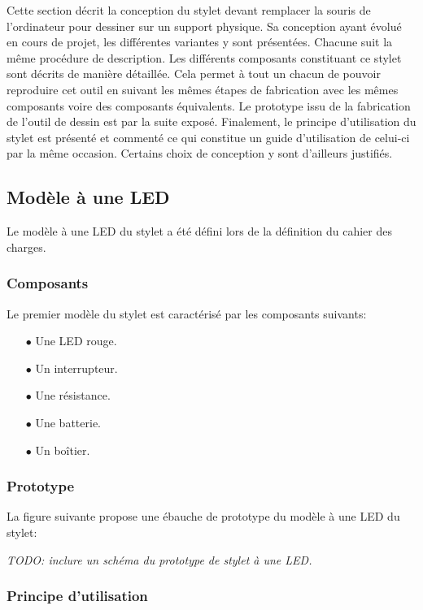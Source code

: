 \documentclass[11pt,a4paper,oldfontcommands]{memoir}
\begin{document}
Cette section décrit la conception du stylet devant remplacer la souris de l'ordinateur pour dessiner sur un support physique. Sa conception ayant évolué en cours de projet, les différentes variantes y sont présentées. Chacune suit la même procédure de description. Les différents composants constituant ce stylet sont décrits de manière détaillée. Cela permet à tout un chacun de pouvoir reproduire cet outil en suivant les mêmes étapes de fabrication avec les mêmes composants voire des composants équivalents. Le prototype issu de la fabrication de l'outil de dessin est par la suite exposé. Finalement, le principe d'utilisation du stylet est présenté et commenté ce qui constitue un guide d'utilisation de celui-ci par la même occasion. Certains choix de conception y sont d'ailleurs justifiés.

\subsection{Modèle à une LED}

Le modèle à une LED du stylet a été défini lors de la définition du cahier des charges.

\subsubsection{Composants}

Le premier modèle du stylet est caractérisé par les composants suivants:

\begin{itemize}
\item[$\bullet$] Une LED rouge.
\item[$\bullet$] Un interrupteur.
\item[$\bullet$] Une résistance.
\item[$\bullet$] Une batterie.
\item[$\bullet$] Un boîtier.
\end{itemize}

\subsubsection{Prototype}

La figure suivante propose une ébauche de prototype du modèle à une LED du stylet:

\textit{TODO: inclure un schéma du prototype de stylet à une LED.}

\subsubsection{Principe d'utilisation}
\end{document}
